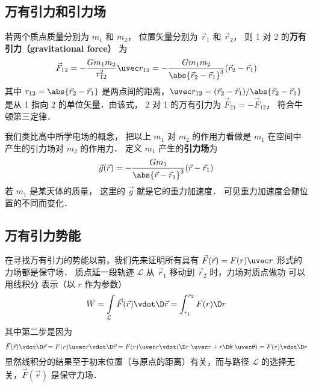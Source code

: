 

\subsection{万有引力和引力场}

若两个质点质量分别为 $m_1$ 和 $m_2$， 位置矢量分别为 $\vec r_1$ 和 $\vec r_2$， 则 1 对 2 的\textbf{万有引力（gravitational force）} 为
\begin{equation}\label{Gravty_eq1}
\vec F_{12} =  - \frac{G m_1 m_2}{r_{12}^2} \uvec r_{12} = - \frac{G m_1 m_2}{\abs{\vec r_2 - \vec r_1}^3}(\vec r_2 - \vec r_1)
\end{equation}
其中 $r_{12} = \abs{\vec r_2 - \vec r_1}$ 是两点间的距离，$\uvec r_{12} = (\vec r_2 - \vec r_1)/\abs{\vec r_2 - \vec r_1}$ 是从 1 指向 2 的单位矢量．由该式， 2 对 1 的万有引力为 $\vec F_{21} = -\vec F_{12}$， 符合牛顿第三定律．

我们类比高中所学电场的概念， 把以上 $m_1$ 对 $m_2$ 的作用力看做是 $m_1$ 在空间中产生的引力场对 $m_2$ 的作用力． 定义 $m_1$ 产生的\textbf{引力场}为
\begin{equation}\label{Gravty_eq2}
\vec g(\vec r) = -\frac{Gm_1}{\abs{\vec r - \vec r_1} ^3}(\vec r - \vec r_1)
\end{equation}
若 $m_1$ 是某天体的质量， 这里的 $\vec g$ 就是它的重力加速度． 可见重力加速度会随位置的不同而变化．

\subsection{万有引力势能}
在寻找万有引力的势能以前，我们先来证明所有具有 $\vec F(\vec r) = F(r) \uvec r$ 形式的力场都是保守场． 质点延一段轨迹 $\mathcal{L}$ 从 $\vec r_1$ 移动到 $\vec r_2$ 时，力场对质点做功 可以用线积分 表示（以 $r$ 作为参数）
\begin{equation}
W = \int\limits_\mathcal{L} \vec F(\vec r) \vdot \D\vec r = \int_{r_1}^{r_2} F(r) \D r
\end{equation}
其中第二步是因为
\begin{equation}
\vec F(\vec r) \vdot \D\vec r = F(r)\uvec r \vdot \D\vec r = F(r)\uvec  r \vdot (\D r\;\uvec  r + r\D\theta \;\uvec  \theta ) = F(r) \vdot \D r
\end{equation}
显然线积分的结果至于初末位置（与原点的距离）有关，而与路径 $\mathcal{L}$ 的选择无关，$\vec F(\vec r)$ 是保守力场．

